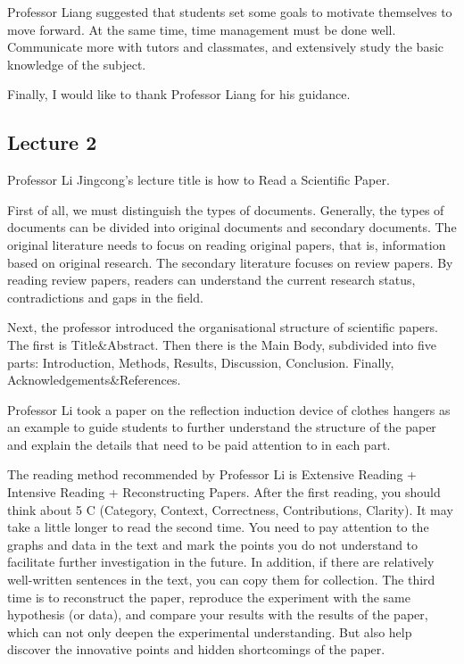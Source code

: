 \documentclass[UTF-8]{ctexart}
\begin{document}
Professor Liang suggested that students set some goals to motivate themselves to move forward. At the same time, time management must be done well. Communicate more with tutors and classmates, and extensively study the basic knowledge of the subject. 

Finally, I would like to thank Professor Liang for his guidance.

\subsection{Lecture 2}
Professor Li Jingcong’s lecture title is how to Read a Scientific Paper.

First of all,  we must distinguish the types of documents. Generally, the types of documents can be divided into original documents and secondary documents. The original literature needs to focus on reading original papers, that is, information based on original research. The secondary literature focuses on review papers. By reading review papers, readers can understand the current research status, contradictions and gaps in the field. 

Next, the professor introduced the organisational structure of scientific papers. The first is Title\&Abstract. Then there is the Main Body, subdivided into five parts: Introduction, Methods, Results, Discussion, Conclusion. Finally, Acknowledgements\&References. 

Professor Li took a paper on the reflection induction device of clothes hangers as an example to guide students to further understand the structure of the paper and explain the details that need to be paid attention to in each part. 

The reading method recommended by Professor Li is Extensive Reading + Intensive Reading + Reconstructing Papers. After the first reading, you should think about 5 C (Category, Context, Correctness, Contributions, Clarity). It may take a little longer to read the second time. You need to pay attention to the graphs and data in the text and mark the points you do not understand to facilitate further investigation in the future. In addition, if there are relatively well-written sentences in the text, you can copy them for collection. The third time is to reconstruct the paper, reproduce the experiment with the same hypothesis (or data), and compare your results with the results of the paper, which can not only deepen the experimental understanding. But also help discover the innovative points and hidden shortcomings of the paper.
\end{document}

